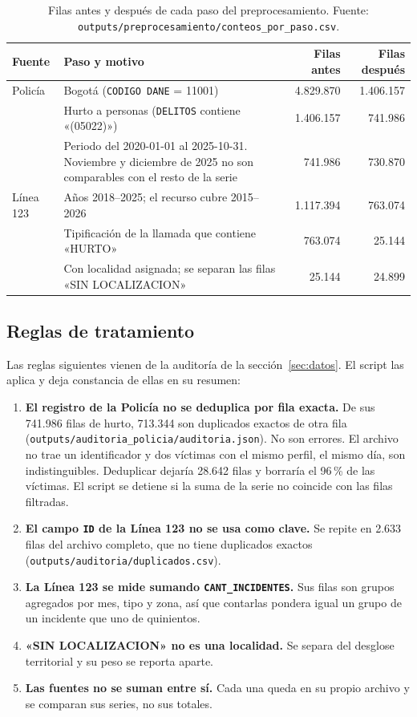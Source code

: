 \begin{table}[H]
\centering
\caption{Filas antes y después de cada paso del preprocesamiento. Fuente: \texttt{outputs/\allowbreak{}preprocesamiento/\allowbreak{}conteos\_\allowbreak{}por\_\allowbreak{}paso.csv}.}\label{tab:pasos}
\small
\begin{tabular}{@{}p{2.1cm}p{6.6cm}rr@{}}
\toprule
\textbf{Fuente} & \textbf{Paso y motivo} & \textbf{Filas antes} & \textbf{Filas después} \\
\midrule
Policía & Bogotá (\texttt{CODIGO DANE} = 11001) & 4.829.870 & 1.406.157 \\
 & Hurto a personas (\texttt{DELITOS} contiene «(05022)») & 1.406.157 & 741.986 \\
 & Periodo del 2020-01-01 al 2025-10-31. Noviembre y diciembre de 2025 no son comparables con el resto de la serie & 741.986 & 730.870 \\
\midrule
Línea 123 & Años 2018--2025; el recurso cubre 2015--2026 & 1.117.394 & 763.074 \\
 & Tipificación de la llamada que contiene «HURTO» & 763.074 & 25.144 \\
 & Con localidad asignada; se separan las filas «SIN LOCALIZACION» & 25.144 & 24.899 \\
\bottomrule
\end{tabular}
\end{table}

\subsection{Reglas de tratamiento}

Las reglas siguientes vienen de la auditoría de la sección~\ref{sec:datos}. El script las aplica y deja constancia de ellas en su resumen:
\begin{enumerate}
  \item \textbf{El registro de la Policía no se deduplica por fila exacta.} De sus 741.986 filas de hurto, 713.344 son duplicados exactos de otra fila (\texttt{outputs/\allowbreak{}auditoria\_\allowbreak{}policia/\allowbreak{}auditoria.json}). No son errores. El archivo no trae un identificador y dos víctimas con el mismo perfil, el mismo día, son indistinguibles. Deduplicar dejaría 28.642 filas y borraría el 96\,\% de las víctimas. El script se detiene si la suma de la serie no coincide con las filas filtradas.
  \item \textbf{El campo \texttt{ID} de la Línea 123 no se usa como clave.} Se repite en 2.633 filas del archivo completo, que no tiene duplicados exactos (\texttt{outputs/auditoria/duplicados.csv}).
  \item \textbf{La Línea 123 se mide sumando \texttt{CANT\_INCIDENTES}.} Sus filas son grupos agregados por mes, tipo y zona, así que contarlas pondera igual un grupo de un incidente que uno de quinientos.
  \item \textbf{«SIN LOCALIZACION» no es una localidad.} Se separa del desglose territorial y su peso se reporta aparte.
  \item \textbf{Las fuentes no se suman entre sí.} Cada una queda en su propio archivo y se comparan sus series, no sus totales.
\end{enumerate}

